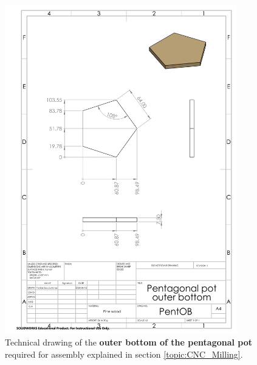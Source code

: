 \documentclass[12pt]{extarticle} %
\begin{document}
\begin{figure}[ht]
    \centering
    \includegraphics[width=0.9\textwidth]{images/technical_drawings/Pentagonal pot outer bottom-1.png}
    \caption{Technical drawing of the \textbf{outer bottom of the pentagonal pot} required for assembly explained in section \ref{topic:CNC_Milling}.}
    \label{technical_drawing:pent_pot_outer_bottom}
\end{figure}
\pagebreak
\end{document}
